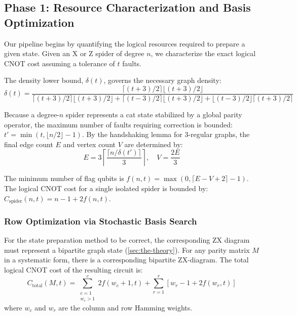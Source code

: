\documentclass[11pt]{article}
\theoremstyle{definition}
\begin{document}
\subsection{Phase 1: Resource Characterization and Basis Optimization}
Our pipeline begins by quantifying the logical resources required to prepare a given state.
Given an X or Z spider of degree $n$, we characterize the exact logical CNOT cost assuming a tolerance of $t$ faults.

The density lower bound, $\delta(t)$, governs the necessary graph density:
\begin{equation}
\delta(t) = \frac{\lceil(t+3)/2\rceil \lfloor(t+3)/2\rfloor}{\lceil(t+3)/2\rceil \lfloor(t+3)/2\rfloor + \lceil(t-3)/2\rceil \lfloor(t+3)/2\rfloor + \lfloor(t-3)/2\rfloor \lceil(t+3)/2\rceil}
\end{equation}

Because a degree-$n$ spider represents a cat state stabilized by a global parity operator, the maximum number of faults requiring correction is bounded: $t' = \min\left(t, \lfloor n/2 \rfloor - 1\right)$. By the handshaking lemma for 3-regular graphs, the final edge count $E$ and vertex count $V$ are determined by:
\begin{equation}
E = 3 \left\lceil \frac{\lceil n / \delta(t') \rceil}{3} \right\rceil, \quad V = \frac{2E}{3}
\end{equation}

The minimum number of flag qubits is $f(n, t) = \max\left(0, \lceil E - V + 2 \rceil - 1\right)$. The logical CNOT cost for a single isolated spider is bounded by: $C_{\text{spider}}(n, t) = n - 1 + 2f(n, t)$.

\subsubsection*{Row Optimization via Stochastic Basis Search}
For the state preparation method to be correct, the corresponding ZX diagram must represent a bipartite graph state (\cref{sec:the-theory}).
For any parity matrix $M$ in a systematic form, there is a corresponding bipartite ZX-diagram.
The total logical CNOT cost of the resulting circuit is:
\begin{equation}
C_{\text{total}}(M, t) = \sum_{\substack{c=1 \\ w_c > 1}}^c 2f(w_c + 1, t) + \sum_{r=1}^r \left[ w_r - 1 + 2f(w_r, t) \right]
\end{equation}
where $w_c$ and $w_r$ are the column and row Hamming weights.
\end{document}
